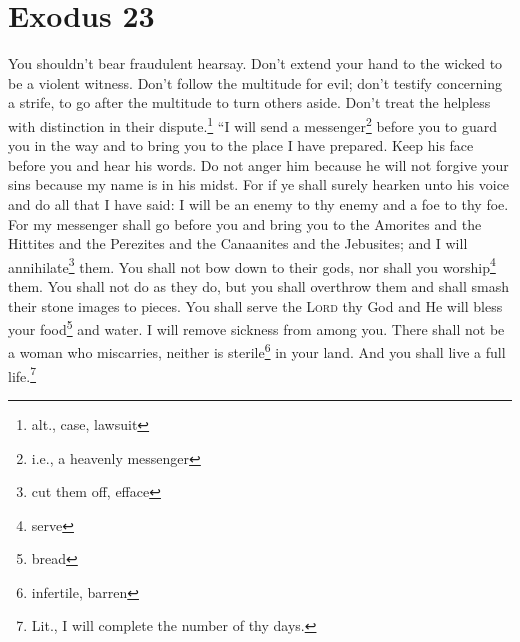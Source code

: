 \section{Exodus 23}\label{Exodus 23}
\begin{enumerate}[align=center]
     You shouldn't bear fraudulent hearsay. Don't extend your hand to the wicked to be a violent witness.%
     Don't follow the multitude for evil; don't testify concerning a strife, to go after the multitude to turn others aside.%
     Don't treat the helpless with distinction in their dispute.\footnote{alt., case, lawsuit}%
     ``I will send a messenger\footnote{i.e., a heavenly messenger} before you to guard you in the way and to bring you to the place I have prepared.%
     Keep his face before you and hear his words. Do not anger him because he will not forgive your sins because my name is in his midst.%
     For if ye shall surely hearken unto his voice and do all that I have said: I will be an enemy to thy enemy and a foe to thy foe.%
     For my messenger shall go before you and bring you to the Amorites and the Hittites and the Perezites and the Canaanites and the Jebusites; and I will annihilate\footnote{cut them off, efface} them.%
     You shall not bow down to their gods, nor shall you worship\footnote{serve} them. You shall not do as they do, but you shall overthrow them and shall smash their stone images to pieces.%
     You shall serve the \textsc{Lord} thy God and He will bless your food\footnote{bread} and water. I will remove sickness from among you.%
     There shall not be a woman who miscarries, neither is sterile\footnote{infertile, barren} in your land. And you shall live a full life.\footnote{Lit., I will complete the number of thy days.}%

\end{enumerate}

